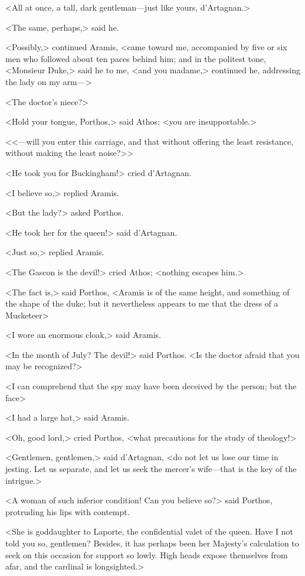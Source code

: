<All at once, a tall, dark gentleman---just like yours, d'Artagnan.> 

<The same, perhaps,> said he. 

<Possibly,> continued Aramis, <came toward me, accompanied by five or six men who followed about ten paces behind him; and in the politest tone, <Monsieur Duke,> said he to me, <and you madame,> continued he, addressing the lady on my arm---> 

<The doctor's niece?> 

<Hold your tongue, Porthos,> said Athos; <you are insupportable.> 

<<---will you enter this carriage, and that without offering the least resistance, without making the least noise?>> 

<He took you for Buckingham!> cried d'Artagnan. 

<I believe so,> replied Aramis. 

<But the lady?> asked Porthos. 

<He took her for the queen!> said d'Artagnan. 

<Just so,> replied Aramis. 

<The Gascon is the devil!> cried Athos; <nothing escapes him.> 

<The fact is,> said Porthos, <Aramis is of the same height, and something of the shape of the duke; but it nevertheless appears to me that the dress of a Musketeer\longdash> 

<I wore an enormous cloak,> said Aramis. 

<In the month of July? The devil!> said Porthos. <Is the doctor afraid that you may be recognized?> 

<I can comprehend that the spy may have been deceived by the person; but the face\longdash> 

<I had a large hat,> said Aramis. 

<Oh, good lord,> cried Porthos, <what precautions for the study of theology!> 

<Gentlemen, gentlemen,> said d'Artagnan, <do not let us lose our time in jesting. Let us separate, and let us seek the mercer's wife---that is the key of the intrigue.> 

<A woman of such inferior condition! Can you believe so?> said Porthos, protruding his lips with contempt. 

<She is goddaughter to Laporte, the confidential valet of the queen. Have I not told you so, gentlemen? Besides, it has perhaps been her Majesty's calculation to seek on this occasion for support so lowly. High heads expose themselves from afar, and the cardinal is longsighted.> 


